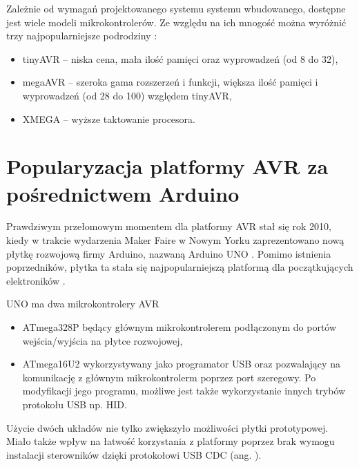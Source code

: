 Zależnie od wymagań projektowanego systemu systemu wbudowanego, dostępne jest wiele modeli mikrokontrolerów. Ze względu na ich mnogość można wyróżnić trzy najpopularniejsze podrodziny \cite{30009630M8bitPIC2018}:
\begin{itemize}
\item tinyAVR -- niska cena, mała ilość pamięci oraz wyprowadzeń (od 8 do 32),
\item megaAVR -- szeroka gama rozszerzeń i funkcji, większa ilość pamięci i wyprowadzeń (od 28 do 100) względem tinyAVR,
\item XMEGA -- wyższe taktowanie procesora.
\end{itemize}

\section{Popularyzacja platformy AVR za pośrednictwem Arduino}

Prawdziwym przełomowym momentem dla platformy AVR stał się rok 2010, kiedy w trakcie wydarzenia Maker Faire w Nowym Yorku zaprezentowano nową płytkę rozwojową firmy Arduino, nazwaną Arduino UNO \cite{teamOneBoardRule2021}. Pomimo istnienia poprzedników, płytka ta stała się najpopularniejszą platformą dla początkujących elektroników \cite{teamOneBoardRule2021}.

UNO ma dwa mikrokontrolery AVR \cite{R3ArduinoDocumentation,teamOneBoardRule2021}
\begin{itemize}
\item ATmega328P będący głównym mikrokontrolerem podłączonym do portów wejścia/wyjścia na płytce rozwojowej,
\item ATmega16U2 wykorzystywany jako programator USB oraz pozwalający na komunikację z głównym mikrokontrolerm poprzez port szeregowy. Po modyfikacji jego programu, możliwe jest także wykorzystanie innych trybów protokołu USB np. HID.
\end{itemize}
Użycie dwóch układów nie tylko zwiększyło możliwości płytki prototypowej. Miało także wpływ na łatwość korzystania z platformy poprzez brak wymogu instalacji sterowników dzięki protokołowi USB CDC (ang. ).

